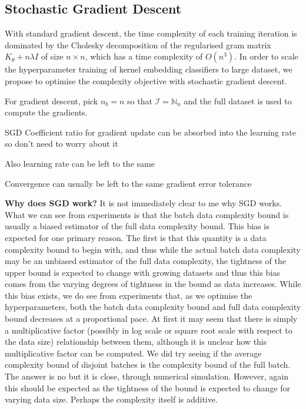 \documentclass{article}
\begin{document}
	\subsection{Stochastic Gradient Descent}
	\label{sec:stochastic_gradient_descent}

		With standard gradient descent, the time complexity of each training iteration is dominated by the Cholesky decomposition of the regularised gram matrix $K_{\theta} + n \lambda I$ of size $n \times n$, which has a time complexity of $O(n^{3})$. In order to scale the hyperparameter training of kernel embedding classifiers to large dataset, we propose to optimise the complexity objective with stochastic gradient descent.
		
	
	
		
		For gradient descent, pick $n_{b} = n$ so that $\mathcal{I} = \mathbb{N}_{n}$ and the full dataset is used to compute the gradients.
		
		SGD Coefficient ratio for gradient update can be absorbed into the learning rate so don't need to worry about it
		
		Also learning rate can be left to the same
		
		Convergence can usually be left to the same gradient error tolerance
		
		\textbf{Why does SGD work?} It is not immediately clear to me why SGD works. What we can see from experiments is that the batch data complexity bound is usually a biased estimator of the full data complexity bound. This bias is expected for one primary reason. The first is that this quantity is a data complexity bound to begin with, and thus while the actual batch data complexity may be an unbiased estimator of the full data complexity, the tightness of the upper bound is expected to change with growing datasets and thus this bias comes from the varying degrees of tightness in the bound as data increases. While this bias exists, we do see from experiments that, as we optimise the hyperparameters, both the batch data complexity bound and full data complexity bound decreases at a proportional pace. At first it may seem that there is simply a multiplicative factor (possibly in log scale or square root scale with respect to the data size) relationship between them, although it is unclear how this multiplicative factor can be computed. We did try seeing if the average complexity bound of disjoint batches is the complexity bound of the full batch. The answer is no but it is close, through numerical simulation. However, again this should be expected as the tightness of the bound is expected to change for varying data size. Perhaps the complexity itself is additive.
		
\end{document}
